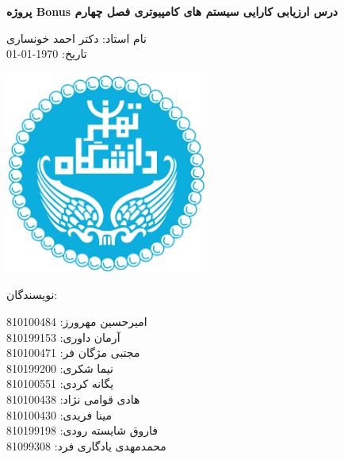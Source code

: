 \documentclass[a4paper,14pt]{article}
\begin{document}
	\fontsize{14}{14}\selectfont
	
	
	
	\begin{titlepage}
		\begin{center}
			
			\Huge
			
			\textbf{پروژه Bonus درس ارزیابی کارایی سیستم های کامپیوتری فصل چهارم}
			
			\vspace{1cm}
			
			\LARGE
			
			
			نام استاد: دکتر احمد خونساری\\
				تاریخ: \today
			
			\vspace{1cm}
			
			\includegraphics[width=0.5\textwidth]{Figures/teh.png}
			
			
			
			نویسندگان:\\
			
			\vspace{0.5cm}
			
			امیرحسین مهرورز: 810100484\\
			آرمان داوری: 810199153\\
			مجتبی مژگان فر: 810100471\\
			نیما شکری: 810199200\\
			یگانه کردی: 810100551\\
			هادی قوامی نژاد: 810100438\\
			مینا فریدی: 810100430\\
			فاروق شایسته رودی: 810199198\\
			محمدمهدی یادگاری فرد: 81099308
			
			\vspace{0.5cm}
			
		
		
			
		\end{center}
	\end{titlepage}
	
\end{document}
